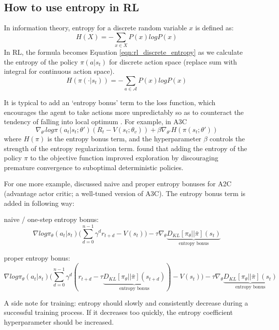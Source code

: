 \documentclass[lang=en,mode=normal,device=normal,color=blue,12pt]{elegantnote}
\DeclareMathOperator*{\1}{\mathbbm{1}}
\begin{document}
\begin{appendices}
\subsection{How to use entropy in RL}

In information theory, entropy for a discrete random variable $x$ is defined as: 
\begin{equation}
\label{eqn:info_entropy}
H(X) = -\sum_{x\in X} P(x) logP(x)
\end{equation}
In RL, the formula becomes Equation \ref{eqn:rl_discrete_entropy} as we calculate the entropy of the policy $\pi(a|s_t)$ for discrete action space (replace sum with integral for continuous action space).
\begin{equation}
\label{eqn:rl_discrete_entropy}
H(\pi(\cdot|s_t)) = -\sum_{a\in \mathcal{A}} P(x) log P(x)
\end{equation}

It is typical to add an `entropy bonus' term to the loss function, which encourages the agent to take actions more unpredictably so as to counteract the tendency of falling into local optimum \cite{odonoghue2017combining}.
For example, in A3C \cite{mnih2016asynchronous}
\[
\nabla_{\theta'}log\pi (a_t | s_t; \theta')(R_t - V(s_t;\theta_v))+\beta\nabla_{\theta'}H(\pi(s_t;\theta'))
\]
where $H(\pi)$ is the entropy bonus term, and the hyperparameter $\beta$ controls the strength of the entropy regularization term. \cite{mnih2016asynchronous} found that adding the entropy of the policy $\pi$ to the objective function improved exploration by discouraging premature convergence to suboptimal deterministic policies.

For one more example, \cite{schulman2018equivalence} discussed naive and proper entropy bonuses for A2C (advantage actor critic; a well-tuned version of A3C). The entropy bonus term is added in following way:

naive / one-step entropy bonus:
\[
\nabla log \pi_\theta (a_t | s_t) \bigg( \sum_{d=0}^{n-1} \gamma^d r_{t+d} - V(s_t) \bigg) - \tau \nabla_\theta \underbrace{ D_{KL} [\pi_\theta || \bar{\pi} ] (s_t)}_\text{entropy bonus}
\]

proper entropy bonus:
\[
\nabla log \pi_\theta (a_t | s_t) \bigg( \sum_{d=0}^{n-1} \gamma^d (r_{t+d} - \tau \underbrace{ D_{KL}[\pi_\theta || \bar{\pi}](s_{t+d})}_\text{entropy bonus} ) - V(s_t) \bigg) - \tau \nabla_\theta \underbrace{ D_{KL} [\pi_\theta || \bar{\pi} ] (s_t) }_\text{entropy bonus}
\]

A side note for training: entropy should slowly and consistently decrease during a successful training process. If it decreases too quickly, the entropy coefficient hyperparameter should be increased.



\end{appendices}
\end{document}
